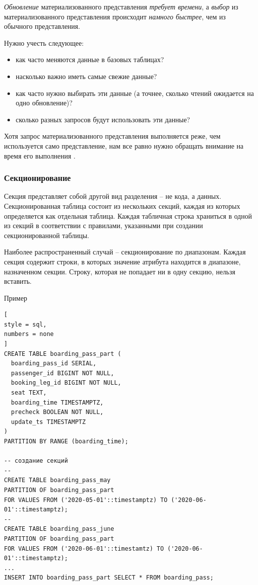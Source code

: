\documentclass[%
	11pt,
	a4paper,
	utf8,
		]{article}
\begin{document}
\emph{Обновление} материализованного представления \emph{требует времени}, а \emph{выбор} из материализованного представления происходит \emph{намного быстрее}, чем из обычного представления.

Нужно учесть следующее:
\begin{itemize}
	\item как часто меняются данные в базовых таблицах?
	
	\item насколько важно иметь самые свежие данные?
	
	\item как часто нужно выбирать эти данные (а точнее, сколько чтений ожидается на одно обновление)?
	
	\item сколько разных запросов будут использовать эти данные?
\end{itemize}

Хотя запрос материализованного представления выполняется реже, чем используется само представление, нам все равно нужно обращать внимание на время его выполнения \cite[]{dombrovskaya:postgresql-2022}.

\subsubsection{Секционирование}

Секция представляет собой другой вид разделения -- не кода, а данных. Секционированная таблица состоит из нескольких секций, каждая из которых определяется как отдельная таблица. Каждая табличная строка храниться в одной из секций в соответствии с правилами, указанными при создании секционированной таблицы.

Наиболее распространенный случай -- секционирование по диапазонам. Каждая секция содержит строки, в которых значение атрибута находится в диапазоне, назначенном секции. Строку, которая не попадает ни в одну секцию, нельзя вставить.

Пример
\begin{lstlisting}[
style = sql,
numbers = none	
]
CREATE TABLE boarding_pass_part (
  boarding_pass_id SERIAL,
  passenger_id BIGINT NOT NULL,
  booking_leg_id BIGINT NOT NULL,
  seat TEXT,
  boarding_time TIMESTAMPTZ,
  precheck BOOLEAN NOT NULL,
  update_ts TIMESTAMPTZ
)
PARTITION BY RANGE (boarding_time);

-- создание секций
-- 
CREATE TABLE boarding_pass_may
PARTITION OF boarding_pass_part
FOR VALUES FROM ('2020-05-01'::timestamptz) TO ('2020-06-01'::timestamptz);
--
CREATE TABLE boarding_pass_june
PARTITION OF boarding_pass_part
FOR VALUES FROM ('2020-06-01'::timestamtz) TO ('2020-06-01'::timestamptz);
...
INSERT INTO boarding_pass_part SELECT * FROM boarding_pass;
\end{lstlisting}
\end{document}
